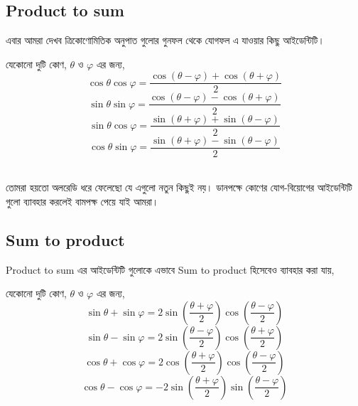 \documentclass[12pt]{article}
\begin{document}
\subsection{Product to sum}
এবার আমরা দেখব ত্রিকোণোমিতিক অনুপাত গুলোর গুনফল থেকে যোগফল এ যাওয়ার কিছু আইডেন্টিটি।
\begin{theom*}
    যেকোনো দুটি কোণ, $\theta$ ও $\varphi$ এর জন্য,
    $${\displaystyle \cos \theta \cos \varphi =\dfrac{\cos(\theta -\varphi )+\cos(\theta +\varphi )}{2}}$$
    $${\displaystyle \sin \theta \sin \varphi =\dfrac{\cos(\theta -\varphi )-\cos(\theta +\varphi )}{2}}$$
    $${\displaystyle \sin \theta \cos \varphi =\dfrac{\sin(\theta +\varphi )+\sin(\theta -\varphi )}{2}}$$
    $${\displaystyle \cos \theta \sin \varphi =\dfrac{\sin(\theta +\varphi )-\sin(\theta -\varphi )}{2}}$$
\end{theom*}
$\qquad$\\
তোমরা হয়তো অলরেডি ধরে ফেলেছো যে এগুলো নতুন কিছুই নয়। ডানপক্ষে কোণের যোগ-বিয়োগের আইডেন্টিটি গুলো 
ব্যাবহার করলেই বামপক্ষ পেয়ে যাই আমরা। 
\subsection{Sum to product}
Product to sum এর আইডেন্টিটি গুলোকে এভাবে Sum to product হিসেবেও ব্যাবহার করা যায়, 
\begin{theom*}
    যেকোনো দুটি কোণ, $\theta$ ও $\varphi$ এর জন্য,
    $$\sin \theta + \sin \varphi =2\sin \left({\frac {\theta + \varphi }{2}}\right)\cos \left({\frac {\theta - \varphi }{2}}\right)$$
    $$\sin \theta - \sin \varphi =2\sin \left({\frac {\theta - \varphi }{2}}\right)\cos \left({\frac {\theta + \varphi }{2}}\right)$$
    $$\cos \theta +\cos \varphi =2\cos \left({\frac {\theta +\varphi }{2}}\right)\cos \left({\frac {\theta -\varphi }{2}}\right)$$
    $$\cos \theta -\cos \varphi =-2\sin \left({\frac {\theta +\varphi }{2}}\right)\sin \left({\frac {\theta -\varphi }{2}}\right)$$
\end{theom*}
\end{document}
